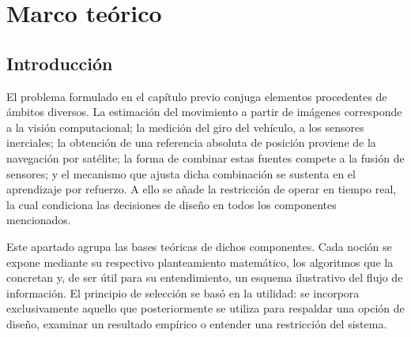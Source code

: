 
\chapter{Marco teórico}
\label{ch:marco}

\section{Introducción}

El problema formulado en el capítulo previo conjuga elementos procedentes de ámbitos diversos.
La estimación del movimiento a partir de imágenes corresponde a la visión computacional; la medición del giro del vehículo, a los sensores inerciales; la obtención de una referencia absoluta de posición proviene de la navegación por satélite; la forma de combinar estas fuentes compete a la fusión de sensores; y el mecanismo que ajusta dicha combinación se sustenta en el aprendizaje por refuerzo.
A ello se añade la restricción de operar en tiempo real, la cual condiciona las decisiones de diseño en todos los componentes mencionados.

Este apartado agrupa las bases teóricas de dichos componentes.
Cada noción se expone mediante su respectivo planteamiento matemático, los algoritmos que la concretan y, de ser útil para su entendimiento, un esquema ilustrativo del flujo de información.
El principio de selección se basó en la utilidad: se incorpora exclusivamente aquello que posteriormente se utiliza para respaldar una opción de diseño, examinar un resultado empírico o entender una restricción del sistema.

